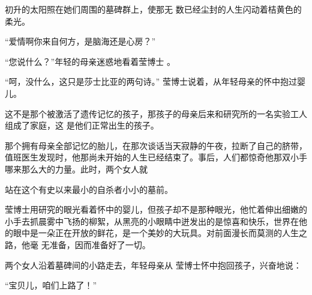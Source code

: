\documentclass{article}
\begin{document}
初升的太阳照在她们周围的墓碑群上，使那无
数已经尘封的人生闪动着桔黄色的柔光。 


“爱情啊你来自何方，是脑海还是心房？” 

“您说什么？”年轻的母亲迷惑地看着莹博士
。 

“呵，没什么，这只是莎士比亚的两句诗。”
莹博士说着，从年轻母亲的怀中抱过婴儿。 

这不是那个被激活了遗传记忆的孩子，那孩子的母亲后来和研究所的一名实验工人组成了家庭，这
是他们正常出生的孩子。 

那个拥有母亲全部记忆的胎儿，在那次谈话当天寂静的午夜，拉断了自己的脐带，值班医生发现时，他那尚未开始的人生已经结束了。事后，人们都惊奇他那双小手哪来那么大的力量。此时，两个女人就
\newpage

站在这个有史以来最小的自杀者小小的墓前。 

莹博士用研究的眼光看着怀中的婴儿，但孩子却不是那种眼光，他忙着伸出细嫩的小手去抓晨雾中飞扬的柳絮，从黑亮的小眼睛中迸发出的是惊喜和快乐，世界在他的眼中是一朵正在开放的鲜花，是一个美妙的大玩具。对前面漫长而莫测的人生之路，他毫
无准备，因而准备好了一切。 

两个女人沿着墓碑间的小路走去，年轻母亲从
莹博士怀中抱回孩子，兴奋地说： 

“宝贝儿，咱们上路了！”
\end{document}
